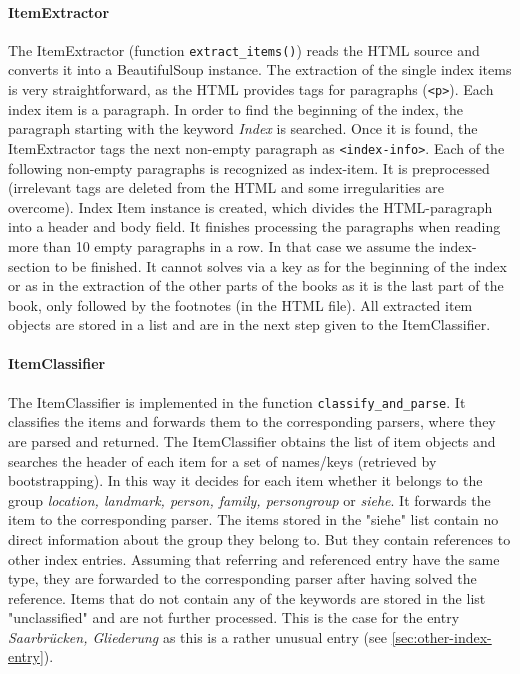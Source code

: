 \paragraph{ItemExtractor}
The ItemExtractor (function \texttt{extract\_items()}) reads the HTML source and converts it into a BeautifulSoup instance. The extraction of the single index items is very straightforward, as the HTML provides tags for paragraphs (\texttt{<p>}). Each index item is a paragraph. In order to find the beginning of the index, the paragraph starting with the keyword \textit{Index} is searched. Once it is found, the ItemExtractor tags the next non-empty paragraph as \texttt{<index-info>}. Each of the following non-empty paragraphs is recognized as index-item. It is preprocessed (irrelevant tags are deleted from the HTML and some irregularities are overcome). Index Item instance is created, which divides the HTML-paragraph into a header and body field. It finishes processing the paragraphs when reading more than 10 empty paragraphs in a row. In that case we assume the index-section to be finished. It cannot solves via a key as for the beginning of the index or as in the extraction of the other parts of the books as it is the last part of the book, only followed by the footnotes (in the HTML file). All extracted item objects are stored in a list and are in the next step given to the ItemClassifier.

\paragraph{ItemClassifier}
The ItemClassifier is implemented in the function \texttt{classify\_and\_parse}. It classifies the items and forwards them to the corresponding parsers, where they are parsed and returned. The ItemClassifier obtains the list of item objects and searches the header of each item for a set of names/keys (retrieved by bootstrapping). In this way it decides for each item whether it belongs to the group \textit{location, landmark, person, family, persongroup} or \textit{siehe}. It forwards the item to the corresponding parser. The items stored in the "siehe" list contain no direct information about the group they belong to. But they contain references to other index entries. Assuming that referring and referenced entry have the same type, they are forwarded to the corresponding parser after having solved the reference. Items that do not contain any of the keywords are stored in the list "unclassified" and are not further processed. This is the case for the entry \textit{Saarbrücken, Gliederung} as this is a rather unusual entry (see \ref{sec:other-index-entry}).

